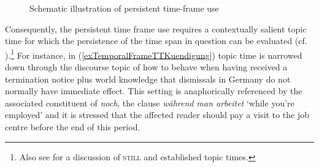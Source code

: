 \begin{figure}[hbt]
\begin{subfigure}[b]{0.48\linewidth}
	\end{subfigure}
	\caption{Schematic illustration of persistent time-frame use\label{figurePersistenTimeFrame}}
\end{figure}

Consequently, the persistent time frame use requires a contextually salient topic time for which the persistence of the time span in question can be evaluated (cf. \cite[266]{Boguslavsky1996}).\footnote{Also see \textcite{Greenberg2008} for a discussion of \textsc{still} and established topic times.} For instance, in (\ref{exTemporalFrameTTKuendigung}) topic time is narrowed down through the discourse topic of how to behave when having received a termination notice plus world knowledge that dismissals in Germany do not normally have immediate effect. This setting is anaphorically referenced by the associated constituent of \textit{noch}, the clause \textit{während man arbeitet} \lq while you're employed' and it is stressed that the affected reader should pay a visit to the job centre before the end of this period.

